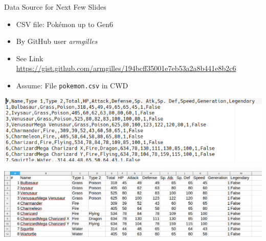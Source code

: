 
\begin{frame}{Data Source for Next Few Slides}
%
\begin{itemize}
\item CSV file: Pokémon up to Gen6
\item By GitHub user \emph{armgilles}
\item See Link\\
	{\scriptsize \url{https://gist.github.com/armgilles/194bcff35001e7eb53a2a8b441e8b2c6}}
\item Assume: File \texttt{pokemon.csv} in CWD
\end{itemize}
%
\begin{minipage}{.49\linewidth}
	\includegraphics[width=\linewidth]{./gfx/pokemon-csv}
\end{minipage}
%
\begin{minipage}{.49\linewidth}
	\includegraphics[width=\linewidth]{./gfx/pokemon-spreadsheet}
\end{minipage}
%
\end{frame}



